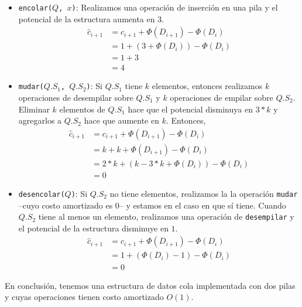 \documentclass{article}
\begin{document}
\begin{itemize}
 \item \texttt{encolar($Q$, $x$)}:
 Realizamos una operación de inserción en una pila y el potencial de la
 estructura aumenta en 3.
 \begin{align*}
  \hat{c}_{i+1} &= c_{i+1} + \Phi(D_{i+1}) - \Phi(D_i) \\
          &= 1 + (3 + \Phi(D_i)) - \Phi(D_i) \\
          &= 1 + 3 \\
          &= 4
 \end{align*}

 \item \texttt{mudar($Q.S_1$, $Q.S_2$)}:
 Si $Q.S_1$ tiene $k$ elementos, entonces realizamos $k$ operaciones de
 desempilar sobre $Q.S_1$ y $k$ operaciones de empilar sobre $Q.S_2$. Eliminar
 $k$ elementos de $Q.S_1$ hace que el potencial disminuya en $3*k$ y agregarlos
 a $Q.S_2$ hace que aumente en $k$. Entonces,
 \begin{align*}
  \hat{c}_{i+1} &= c_{i+1} + \Phi(D_{i+1}) - \Phi(D_i) \\
                &= k + k + \Phi(D_{i+1}) - \Phi(D_i) \\
                &= 2*k + (k - 3*k + \Phi(D_i)) - \Phi(D_i) \\
                &= 0
 \end{align*}

 \item \texttt{desencolar($Q$)}: Si $Q.S_2$ no tiene elementos, realizamos la
 la operación \texttt{mudar} --cuyo costo amortizado es $0$-- y estamos en el
 caso en que sí tiene. Cuando $Q.S_2$ tiene al menos un elemento, realizamos una
 operación de \texttt{desempilar} y el potencial de la estructura disminuye en
 $1$.
 \begin{align*}
  \hat{c}_{i+1} &= c_{i+1} + \Phi(D_{i+1}) - \Phi(D_i) \\
                &= 1 + (\Phi(D_i) -1) - \Phi(D_i) \\
                &= 0
 \end{align*}

\end{itemize}

En conclusión, tenemos una estructura de datos cola implementada con dos pilas
y cuyas operaciones tienen costo amortizado $O(1)$.
\end{document}
